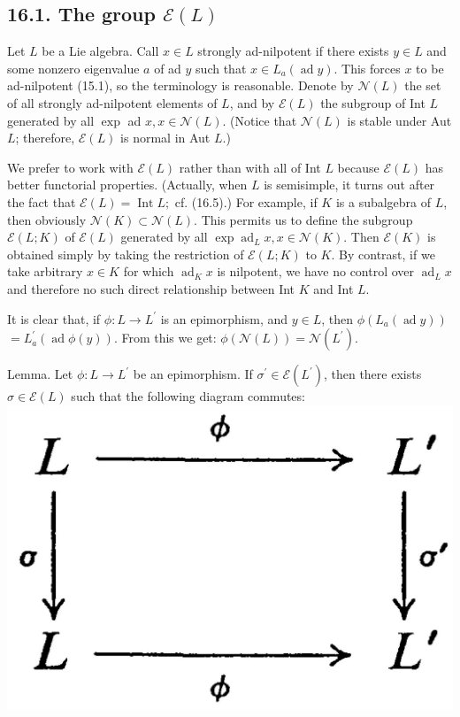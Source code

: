 \documentclass[10pt]{article}
\begin{document}
\subsection*{16.1. The group $\mathscr{E}(L)$}
Let $L$ be a Lie algebra. Call $x \in L$ strongly ad-nilpotent if there exists $y \in L$ and some nonzero eigenvalue $a$ of ad $y$ such that $x \in L_{a}(\operatorname{ad} y)$. This forces $x$ to be ad-nilpotent (15.1), so the terminology is reasonable. Denote by $\mathscr{N}(L)$ the set of all strongly ad-nilpotent elements of $L$, and by $\mathscr{E}(L)$ the subgroup of Int $L$ generated by all $\exp$ ad $x, x \in \mathscr{N}(L)$. (Notice that $\mathscr{N}(L)$ is stable under Aut $L$; therefore, $\mathscr{E}(L)$ is normal in Aut $L$.)

We prefer to work with $\mathscr{E}(L)$ rather than with all of Int $L$ because $\mathscr{E}(L)$ has better functorial properties. (Actually, when $L$ is semisimple, it turns out after the fact that $\mathscr{E}(L)=\operatorname{Int} L ;$ cf. (16.5).) For example, if $K$ is a subalgebra of $L$, then obviously $\mathscr{N}(K) \subset \mathscr{N}(L)$. This permits us to define the subgroup $\mathscr{E}(L ; K)$ of $\mathscr{E}(L)$ generated by all $\exp \operatorname{ad}_{L} x, x \in \mathscr{N}(K)$. Then $\mathscr{E}(K)$ is obtained simply by taking the restriction of $\mathscr{E}(L ; K)$ to $K$. By contrast, if we take arbitrary $x \in K$ for which $\operatorname{ad}_{K} x$ is nilpotent, we have no control over $\operatorname{ad}_{L} x$ and therefore no such direct relationship between Int $K$ and Int $L$.

It is clear that, if $\phi: L \rightarrow L^{\prime}$ is an epimorphism, and $y \in L$, then $\phi\left(L_{a}(\operatorname{ad} y)\right)$ $=L_{a}^{\prime}(\operatorname{ad} \phi(y))$. From this we get: $\phi(\mathscr{N}(L))=\mathscr{N}\left(L^{\prime}\right)$.

Lemma. Let $\phi: L \rightarrow L^{\prime}$ be an epimorphism. If $\sigma^{\prime} \in \mathscr{E}\left(L^{\prime}\right)$, then there exists $\sigma \in \mathscr{E}(L)$ such that the following diagram commutes:\\
\includegraphics[max width=\textwidth, center]{2025_06_06_fac2836a92464059da43g-095}
\end{document}
